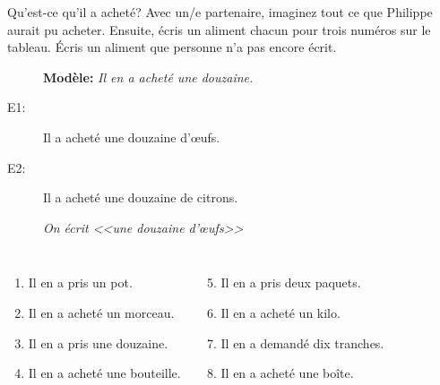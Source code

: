 \begin{frame}{Qu'est-ce qu'il a acheté?}
  Avec un/e partenaire, imaginez tout ce que Philippe aurait pu acheter.
  Ensuite, écris un aliment chacun pour trois numéros sur le tableau. 
  \alert{Écris un aliment que personne n'a pas encore écrit.}\\
  \begin{description}
    \item[] \textbf{Modèle:} \emph{Il en a acheté une douzaine.}
    \item[E1:] Il a acheté une douzaine d'œufs.
    \item[E2:] Il a acheté une douzaine de citrons.
    \item[] \emph{On écrit <<une douzaine d'œufs>>}
  \end{description}
  \begin{columns}
      \begin{enumerate}
        \item Il en a pris un pot.
        \item Il en a acheté un morceau.
        \item Il en a pris une douzaine.
        \item Il en a acheté une bouteille.
      \end{enumerate}
      \begin{enumerate}
        \setcounter{enumi}{4}
        \item Il en a pris deux paquets.
        \item Il en a acheté un kilo.
        \item Il en a demandé dix tranches.
        \item Il en a acheté une boîte.
      \end{enumerate}
  \end{columns}
\end{frame}